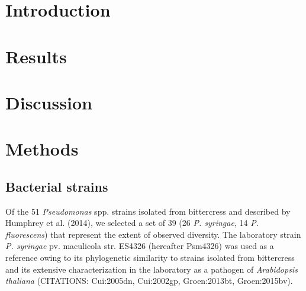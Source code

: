 \documentclass[%
preprint,
superscriptaddress,
 amsmath,amssymb,
 aps,
]{revtex4-1}
\begin{document}
\maketitle
\section*{Introduction}
\section*{Results}
\section*{Discussion}

\section*{Methods}

\subsection*{Bacterial strains}

Of the 51 \emph{Pseudomonas} spp. strains isolated from bittercress and
described by Humphrey et al. (2014), we selected a set of 39 (26
\emph{P. syringae}, 14 \emph{P. fluorescens}) that represent the extent
of observed diversity. The laboratory strain \emph{P. syringae} pv.
maculicola str. ES4326 (hereafter Psm4326) was used as a reference owing
to its phylogenetic similarity to strains isolated from bittercress and
its extensive characterization in the laboratory as a pathogen of
\emph{Arabidopsis thaliana} (CITATIONS: Cui:2005dn, Cui:2002gp, Groen:2013bt,
Groen:2015bv).
\end{document}
